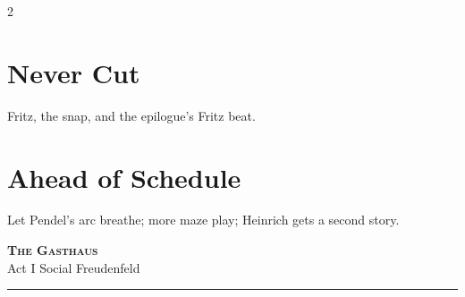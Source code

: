 \documentclass[10pt,letterpaper]{article}
\newcommand{\sceneheader}[4]{%
  \fancyhead[L]{\small\textcolor{accent}{\scshape #1}}%
  \fancyhead[R]{\small\textcolor{accent}{#2 \quad \textbullet \quad #3}}%
  \begin{center}
  {\LARGE\bfseries\scshape\textcolor{accent}{#1}}\\[2pt]
  {\small #2 \quad \textbullet \quad #3 \quad \textbullet \quad #4}\\[2pt]
  \textcolor{rulecol}{\rule{0.5\textwidth}{0.8pt}}
  \end{center}
  \vspace{-4pt}
}
\begin{document}
\begin{multicols}{2}
\section*{Never Cut}
Fritz, the snap, and the epilogue's Fritz beat.

\section*{Ahead of Schedule}
Let Pendel's arc breathe; more maze play; Heinrich gets a second story.

\end{multicols}

\newpage


\label{sec:gasthaus}\sceneheader{The Gasthaus}{Act I}{Social}{Freudenfeld}
\end{document}
